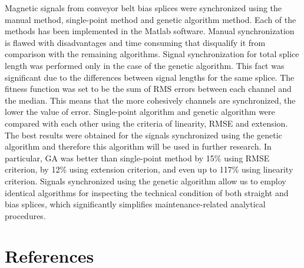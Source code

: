 \documentclass[applsci,article,preprint,moreauthors,pdftex]{Definitions/mdpi}
\begin{document}
Magnetic signals from conveyor belt bias splices were synchronized using the manual method, single-point method and genetic algorithm method. Each of the methods has been implemented in the Matlab software.
Manual synchronization is flawed with disadvantages and time consuming that disqualify it from comparison with the remaining algorithms.
Signal synchronization for total splice length was performed only in the case of the genetic algorithm. This fact was significant due to the differences between signal lengths for the same splice. The fitness function was set to be the sum of RMS errors between each channel and the median. This means that the more cohesively channels are synchronized, the lower the value of error.
Single-point algorithm and genetic algorithm were compared with each other using the criteria of linearity, RMSE and extension. The best results were obtained for the signals synchronized using the genetic algorithm and therefore this algorithm will be used in further research. In particular, GA was better than single-point method by 15\% using RMSE criterion, by 12\% using extension criterion, and even up to 117\% using linearity criterion. Signals synchronized using the genetic algorithm allow us to employ identical algorithms for inspecting the technical condition of both straight and bias splices, which significantly simplifies maintenance-related analytical procedures.


\section*{References}


\end{document}
